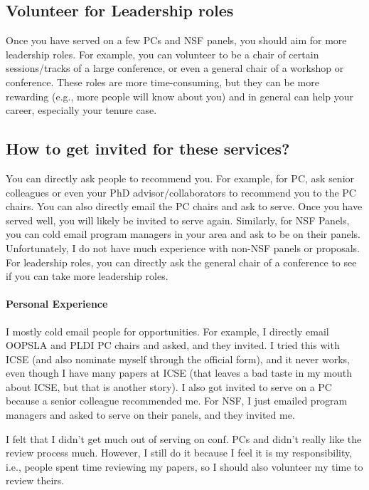 \documentclass[oneside,11pt,dvipsnames]{book}
\begin{document}
\subsection{Volunteer for Leadership roles} Once you have served on a few PCs and NSF panels, you should aim for more leadership roles.  For example, you can volunteer to be a chair of certain sessions/tracks of a large conference, or even a general chair of a workshop or conference.  These roles are more time-consuming, but they can be more rewarding (e.g., more people will know about you) and in general can help your career, especially your tenure case.

\subsection{How to get invited for these services?} 

You can directly ask people to recommend you. For example, for PC, ask senior colleagues or even your PhD advisor/collaborators to recommend you to the PC chairs. You can also directly email the PC chairs and ask to serve.  Once you have served well, you will likely be invited to serve again.  
Similarly, for NSF Panels, you can cold email program managers in your area and ask to be on their panels.  Unfortunately, I do not have much experience with non-NSF panels or proposals. For leadership roles, you can directly ask the general chair of a conference to see if you can take more leadership roles.

\paragraph{Personal Experience} I mostly cold email people for opportunities. For example, I directly email OOPSLA and PLDI PC chairs and asked, and they invited. I tried this with ICSE (and also nominate myself through the official form), and it never works, even though I have many papers at ICSE (that leaves a bad taste in my mouth about ICSE, but that is another story).  I also got invited to serve on a PC because a senior colleague recommended me.
For NSF, I just emailed program managers and asked to serve on their panels, and they invited me.


I felt that I didn't get much out of serving on conf. PCs and didn't really like the review process much. 
However, I still do it because I feel it is my responsibility, i.e., people spent time reviewing my papers, so I should also volunteer my time to review theirs.
\end{document}
